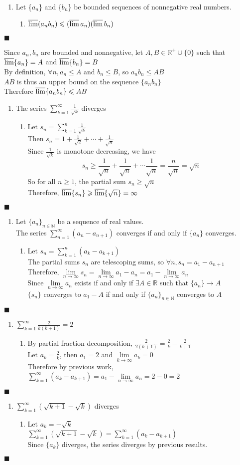 \documentclass[a4paper, 12pt]{report}
\newcommand{\proof}[3]{
	\begin{enumerate}
		\item[\bf{Problem #1}] #2
		\begin{enumerate}
			\item[\bf{Proof:}]
			#3
		\end{enumerate}
	\end{enumerate}
	\begin{flushright}
		$\blacksquare$
	\end{flushright}
}
\begin{document}
\proof{3}{
	Let \{$a_n$\} and \{$b_n$\} be bounded sequences of nonnegative real numbers.
}{
	$\varlimsup(a_n b_n) \leqslant (\varlimsup a_n)(\varlimsup b_n)$
}{
	Since $a_n, b_n$ are bounded and nonnegative, let $A,B \in \mathbb{R}^+ \cup  \{0\}$ such that $\varlimsup \{a_n\} = A$ and $\varlimsup \{b_n\} = B$ \\
	By definition, $\forall n, a_n \leqslant A$ and $b_n \leqslant B$, so $a_n b_n \leqslant AB$ \\
	$AB$ is thus an upper bound on the sequence $\{a_n b_n\}$ \\ 
	Therefore $\varlimsup \{a_n b_n\} \leqslant AB$	
}

\proof{4}{
	The series $\sum\limits_{k=1}^{\infty} \frac{1}{\sqrt{k}}$ diverges
}{
	Let $s_n = \sum\limits_{k=1}^{n} \frac{1}{\sqrt{k}}$ \\
	Then $s_n = 1 + \frac{1}{\sqrt{2}} + \cdots + \frac{1}{\sqrt{n}}$ \\
	Since $\frac{1}{\sqrt{k}}$ is monotone decreasing, we have
	\[
		s_n \geqslant 
		\frac{1}{\sqrt{n}} + \frac{1}{\sqrt{n}} + \cdots \frac{1}{\sqrt{n}}
		= \frac{n}{\sqrt{n}} = \sqrt{n}
	\]
	So for all $n \geqslant 1$, the partial sum $s_n \geqslant \sqrt{n}$ \\
	Therefore, $\varlimsup\{s_n\} \geqslant \varlimsup\{\sqrt{n}\} = \infty$ 
}
\pagebreak
\proof{5}{
	Let $\{a_n\}_{n\in\mathbb{N}}$ be a sequence of real values. \\
	The series $\sum\limits_{n=1}^{\infty}(a_n - a_{n+1})$ converges if and only if $\{a_n\}$ converges.
}{
	Let $s_n = \sum\limits_{k=1}^{n}(a_k - a_{k+1})$ \\
	The partial sums $s_n$ are telescoping sums, so $\forall n, s_n = a_1 - a_{n+1}$ \\
	Therefore, $\lim\limits_{n \to \infty} s_n = \lim\limits_{n \to \infty} a_1 - a_n = a_1 - \lim\limits_{n \to \infty} a_n$ \\
	Since $\lim\limits_{n \to \infty} a_n$ exists if and only if $\exists A \in \mathbb{R}$ such that $\{a_n\} \to A$ \\
	$\{s_n\}$ converges to $a_1 - A$ if and only if $\{a_n\}_{n\in\mathbb{N}}$ converges to $A$
}
\proof{6}{
	$\sum\limits_{k=1}^{\infty}\frac{2}{k(k+1)} = 2$
}{
	By partial fraction decomposition, $\frac{2}{2(k+1)} = \frac{2}{k} - \frac{2}{k+1}$ \\
	Let $a_k = \frac{2}{k}$, then $a_1 = 2$ and $\lim\limits_{k \to \infty} a_k = 0$ \\
	Therefore by previous work, \\
	$\sum\limits_{k=1}^{\infty}(a_k - a_{k+1}) = a_1 - \lim\limits_{n \to \infty}a_n = 2 - 0 = 2$
}
\proof{7}{
	$\sum\limits_{k=1}^{\infty}(\sqrt{k+1} - \sqrt{k})$ diverges
}{
	Let $a_k = - \sqrt{k}$ \\
	$\sum\limits_{k=1}^{\infty}(\sqrt{k+1} - \sqrt{k}) = \sum\limits_{k=1}^{\infty}(a_k - a_{k+1})$ \\
	Since $\{a_k\}$ diverges, the series diverges by previous results.
}
\end{document}
